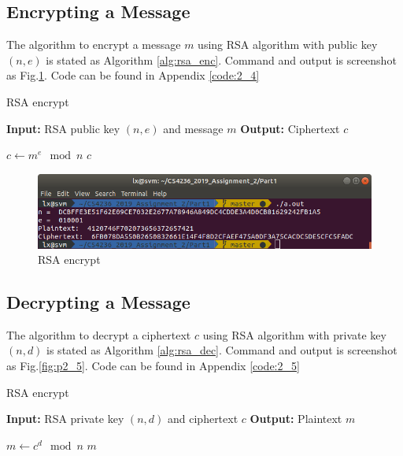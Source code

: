 \subsection{Encrypting a Message}

The algorithm to encrypt a message $m$ using RSA algorithm with public key $(n, e) $ is stated as Algorithm \ref{alg:rsa_enc}.
Command and output is screenshot as Fig.\ref{fig:p2_4}.
Code can be found in Appendix \ref{code:2_4}

\begin{algorithm}
\caption{RSA encrypt}
\label{alg:rsa_enc}
\begin{algorithmic}
\STATE \textbf{Input:} RSA public key $(n, e)$ and message $m$
\STATE \textbf{Output:} Ciphertext $c$

\STATE $ c \gets m^e \mod{n} $
\RETURN $ c $
\end{algorithmic}
\end{algorithm}

\begin{figure}[ht]
\centering
\includegraphics[width=\columnwidth]{resources/p2_4.png}
\caption{
    RSA encrypt
}
\label{fig:p2_4}
\end{figure}

\subsection{Decrypting a Message}

The algorithm to decrypt a ciphertext $c$ using RSA algorithm with private key $(n, d) $ is stated as Algorithm \ref{alg:rsa_dec}.
Command and output is screenshot as Fig.\ref{fig:p2_5}.
Code can be found in Appendix \ref{code:2_5}

\begin{algorithm}
\caption{RSA encrypt}
\label{alg:rsa_dec}
\begin{algorithmic}
\STATE \textbf{Input:} RSA private key $(n, d)$ and ciphertext $c$
\STATE \textbf{Output:} Plaintext $m$

\STATE $ m \gets c^d \mod{n} $
\RETURN $ m $
\end{algorithmic}
\end{algorithm}

